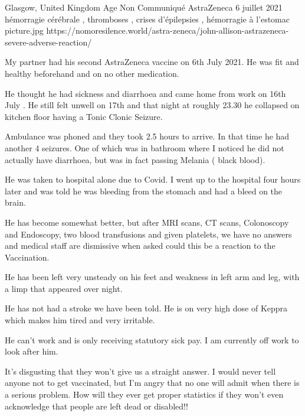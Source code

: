           {Glasgow, United Kingdom}
          {Age Non Communiqué}
          {AstraZeneca}
          {6 juillet 2021}
          {hémorragie cérébrale
            , thromboses
            , crises d'épilepsies
            , hémorragie à l'estomac}
          {picture.jpg}
          {https://nomoresilence.world/astra-zeneca/john-allison-astrazeneca-severe-adverse-reaction/}
          {

My partner had his second AstraZeneca vaccine on 6th July 2021. He was fit and
healthy beforehand and on no other medication.

He thought he had sickness and diarrhoea and came home from work on 16th July
. He still felt unwell on 17th and that night at roughly 23.30 he collapsed on
kitchen floor having a Tonic Clonic Seizure.

Ambulance was phoned and they took 2.5 hours to arrive. In that time he had
another 4 seizures. One of which was in bathroom where I noticed he did not
actually have diarrhoea, but was in fact passing Melania ( black blood).

He was taken to hospital alone due to Covid. I went up to the hospital four
hours later and was told he was bleeding from the stomach and had a bleed on the
brain.

He has become somewhat better, but after MRI scans, CT scans, Colonoscopy and
Endoscopy, two blood transfusions and given platelets, we have no answers and
medical staff are dismissive when asked could this be a reaction to the
Vaccination.

He has been left very unsteady on his feet and weakness in left arm and leg,
with a limp that appeared over night.

He has not had a stroke we have been told. He is on very high dose of Keppra
which makes him tired and very irritable.

He can’t work and is only receiving statutory sick pay. I am currently off work
to look after him.

It’s disgusting that they won’t give us a straight answer. I would never tell
anyone not to get vaccinated, but I’m angry that no one will admit when there is
a serious problem. How will they ever get proper statistics if they won’t even
acknowledge that people are left dead or disabled!!

}

